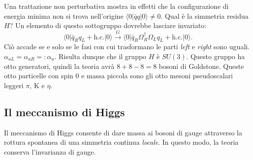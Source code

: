 \documentclass[italian,a4paper]{article}
\theoremstyle{definition}
\begin{document}
Una trattazione non perturbativa mostra in effetti che la configurazione di
energia minima non si trova nell'origine $\langle 0 \vert \bar q q \vert 0
\rangle \neq 0$. Qual \`e la simmetria residua $H$? Un elemento di questo
sottogruppo dovrebbe lasciare invariato:
\begin{equation*}
    \langle 0 \vert \bar q_R q_L + \text{h.c.} \vert 0 \rangle
    \xrightarrow{G} 
    \langle 0 \vert \bar q_R \Omega^\dagger_R \Omega_L q_L + \text{h.c.}
    \vert 0 \rangle.
\end{equation*}
Ci\`o accade se e solo se le fasi con cui trasformano le parti
\emph{left} e \emph{right} sono uguali. $\alpha_{aL} = \alpha_{aR} =\mathop:
\alpha_a$. Risulta dunque che il gruppo $H$ \`e $SU(3)$. Questo gruppo ha
otto generatori, quindi la teoria avr\`a $8 + 8 - 8 = 8$ bosoni di Goldstone.
Queste otto particelle con spin $0$ e massa piccola sono gli otto mesoni
pseudoscalari leggeri $\pi$, $\mathrm{K}$ e $\eta$.
\subsection{Il meccanismo di Higgs}
Il meccanismo di Higgs consente di dare massa ai bosoni di gauge attraverso
la rottura spontanea di una simmetria continua \emph{locale}. In questo
modo, la teoria conserva l'invarianza di gauge.
\end{document}
